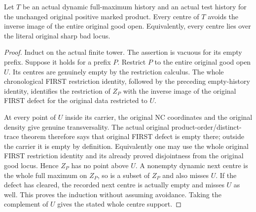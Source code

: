 \begin{theorem}
\label{hir:sharp-actual-dynamic-prefix-original-good-avoidance}
\leanok
Let $T$ be an actual dynamic full-maximum history and an actual test history
for the unchanged original positive marked product. Every centre of $T$
avoids the inverse image of the entire original good open. Equivalently,
every centre lies over the literal original sharp bad locus.
\end{theorem}
\begin{proof}
Induct on the actual finite tower. The assertion is vacuous for its empty
prefix. Suppose it holds for a prefix $P$. Restrict $P$ to the entire
original good open $U$. Its centres are genuinely empty by the restriction
calculus. The whole chronological FIRST restriction identity, followed by
the preceding empty-history identity, identifies the restriction of $Z_P$
with the inverse image of the original FIRST defect for the original data
restricted to $U$.

At every point of $U$ inside its carrier, the original NC coordinates and
the original density give genuine transversality. The actual original
product-order/distinct-trace theorem therefore says that original FIRST
defect is empty there; outside the carrier it is empty by definition.
Equivalently one may use the whole original FIRST restriction identity and
its already proved disjointness from the original good locus. Hence $Z_P$
has no point above $U$. A nonempty dynamic next centre is the whole full
maximum on $Z_P$, so is a subset of $Z_P$ and also misses $U$. If the defect
has cleared, the recorded next centre is actually empty and misses $U$ as
well. This proves the induction without assuming avoidance. Taking the
complement of $U$ gives the stated whole centre support.
\end{proof}

